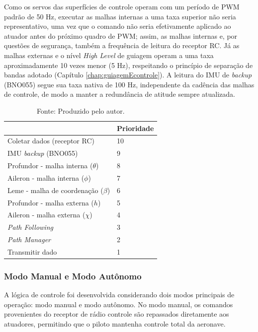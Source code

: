 Como os servos das superfícies de controle operam com um período de PWM padrão de 50 Hz, executar as malhas internas a uma taxa superior não seria representativo, uma vez que o comando não seria efetivamente aplicado ao atuador antes do próximo quadro de PWM; assim, as malhas internas e, por questões de segurança, também a frequência de leitura do receptor RC. Já as malhas externas e o nível \textit{High Level} de guiagem operam a uma taxa aproximadamente 10 vezes menor (5 Hz), respeitando o princípio de separação de bandas adotado (Capítulo \ref{chap:guiagemEcontrole}). A leitura do IMU de \textit{backup} (BNO055) segue sua taxa nativa de 100 Hz, independente da cadência das malhas de controle, de modo a manter a redundância de atitude sempre atualizada.

\begin{table}[H]
\centering
\caption{Prioridade de cada tarefa do GNCU no RTOS.}
\begin{tabular}{|l|l|}
\hline
\rowcolor[HTML]{C0C0C0} 
\multicolumn{1}{|c|}{\textbf{Tarefa}} &
\multicolumn{1}{c|}{\textbf{Prioridade}} \\ \hline
Coletar dados (receptor RC) & 10 \\ \hline
IMU \textit{backup} (BNO055) & 9 \\ \hline
Profundor - malha interna ($\theta$) & 8 \\ \hline
Aileron - malha interna ($\phi$) & 7 \\ \hline
Leme - malha de coordenação ($\beta$)& 6 \\ \hline
Profundor - malha externa ($h$) & 5 \\ \hline
Aileron - malha externa ($\chi$) & 4 \\ \hline
\textit{Path Following} & 3 \\ \hline
\textit{Path Manager} & 2 \\ \hline
Transmitir dado & 1 \\ \hline
\end{tabular}
\label{Tab:RTOSPrioridadesGNCU}
\caption*{Fonte: Produzido pelo autor.}
\end{table}

\subsubsection{Modo Manual e Modo Autônomo}
\label{subsec:modoManualAutonomo}

A lógica de controle foi desenvolvida considerando dois modos principais de operação: modo manual e modo autônomo. No modo manual, os comandos provenientes do receptor de rádio controle são repassados diretamente aos atuadores, permitindo que o piloto mantenha controle total da aeronave.

